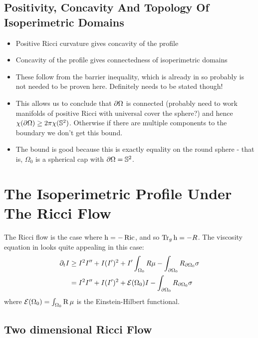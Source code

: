 \documentclass{amsart}
\begin{document}
\subsection{Positivity, Concavity And Topology Of Isoperimetric Domains}

\begin{itemize}
\item Positive Ricci curvature gives concavity of the profile
\item Concavity of the profile gives connectedness of isoperimetric domains
\item These follow from the barrier inequality, which is already in \cite{MR875084} so probably is not needed to be proven here. Definitely needs to be stated though!
\item This allows us to conclude that \(\partial {\Omega}\) is connected (probably need to work manifolds of positive Ricci with universal cover the sphere?) and hence \(\chi(\partial {\Omega}) \geq 2\pi \chi(\mathbb{S}^2)\). Otherwise if there are multiple components to the boundary we don't get this bound.
\item The bound is good because this is exactly equality on the round sphere - that is, \(\Omega_0\) is a spherical cap with \(\partial {\Omega} = \mathbb{S}^2\).
\end{itemize}

\section{The Isoperimetric Profile Under The Ricci Flow}
\label{subsec:flows_ricci}

The Ricci flow is the case where $\operatorname{h} = -\operatorname{Ric}$, and so $\operatorname{Tr}_g \operatorname{h} = -R$. The viscosity equation in  looks quite appealing in this case:
\begin{equation}
\label{eq:viscosity_ricciflow}
\begin{split}
\partial_t I &\geq I^2I'' + I(I')^2 + I'\int_{\Omega_0} R \mu - \int_{\partial {\Omega_0}} R_{\partial {\Omega_0}}\sigma \\
&= I^2I'' + I(I')^2 + \operatorname{\mathcal{E}}(\Omega_0) I - \int_{\partial {\Omega_0}} R_{\partial {\Omega_0}}\sigma
\end{split}
\end{equation}
where \(\operatorname{\mathcal{E}}({\Omega_0}) = \int_{\Omega_0} \operatorname{R} \mu\) is the Einstein-Hilbert functional.

\subsection*{Two dimensional Ricci Flow}
\end{document}
